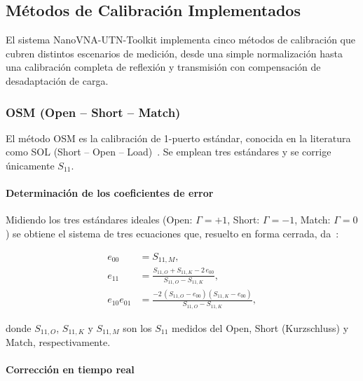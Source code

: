 \newpage
\Encabezado

\subsection{Métodos de Calibración Implementados}
\label{sec:metodos_cal}

El sistema NanoVNA-UTN-Toolkit implementa cinco métodos de calibración que
cubren distintos escenarios de medición, desde una simple normalización hasta
una calibración completa de reflexión y transmisión con compensación de
desadaptación de carga.

\subsubsection{OSM (Open -- Short -- Match)}
\label{sec:osm}

El método OSM es la calibración de 1-puerto estándar, conocida en la
literatura como SOL (Short -- Open -- Load)~\cite{pozar2012}.
Se emplean tres estándares y se corrige únicamente $S_{11}$.

\paragraph{Determinación de los coeficientes de error}

Midiendo los tres estándares ideales (Open: $\Gamma=+1$, Short: $\Gamma=-1$,
Match: $\Gamma=0$) se obtiene el sistema de tres ecuaciones que, resuelto en
forma cerrada, da~\cite{rytting1987}:

\begin{align}
    e_{00} &= S_{11,M},
    \label{eq:e00} \\[4pt]
    e_{11} &= \frac{S_{11,O} + S_{11,K} - 2\,e_{00}}{S_{11,O} - S_{11,K}},
    \label{eq:e11} \\[4pt]
    e_{10}e_{01} &= \frac{-2\,(S_{11,O} - e_{00})(S_{11,K} - e_{00})}
                         {S_{11,O} - S_{11,K}},
    \label{eq:e10e01}
\end{align}

\noindent donde $S_{11,O}$, $S_{11,K}$ y $S_{11,M}$ son los $S_{11}$ medidos
del Open, Short (Kurzschluss) y Match, respectivamente.

\paragraph{Corrección en tiempo real}

